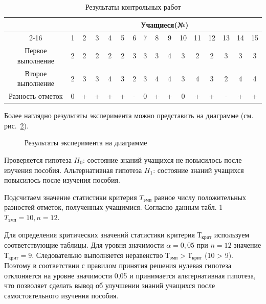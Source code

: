 \documentclass[12pt]{article}
\begin{document}
\begin{table}[h]
    \label{tbl:control-results}
    \centering
    \caption{Результаты контрольных работ}
    \bigskip
    \begin{tabular}{|c|c|c|c|c|c|c|c|c|c|c|c|c|c|c|c|} \hline
         \multirow{2}{*}{}&\multicolumn{15}{c|}{\textbf{Учащиеся(№)}} \\ \cline{2-16}
        &1&2&3&4&5&6&7&8&9&10&11&12&13&14&15 \\ \hline
        Первое выполнение&2&2&2&2&2&3&3&3&4&3&2&2&3&3&3 \\ \hline
        Второе выполнение&2&3&3&4&3&2&3&4&4&3&4&3&2&4&4 \\ \hline
        Разность отметок&0&+&+&+&+&-&0&+&+&0&+&+&-&+&+ \\ \hline
    \end{tabular}
\end{table}

Более наглядно результаты эксперимента можно представить на диаграмме (см. рис.~\hyperref[fgr:control-results]{2}).

\begin{figure}[htbp]
    \label{fgr:control-results}
    \centering
    \caption{Результаты эксперимента на диаграмме}
\end{figure}
 
Проверяется гипотеза $H_0$: состояние знаний учащихся не повысилось после изучения пособия. Альтернативная гипотеза $H_1$: состояние знаний учащихся повысилось после изучения пособия.

Подсчитаем значение статистики критерия $T_{эмп}$ равное числу положительных разностей отметок, полученных учащимися. Согласно данным табл. 1 $T_{эмп}=10, n=12$.

Для определения критических значений статистики критерия $Т_{крит}$ используем соответствующие таблицы. Для уровня значимости $\alpha = 0,05$ при $n = 12$ значение $Т_{крит} = 9$. Следовательно выполняется неравенство $Т_{эмп} > Т_{крит}$ (10 > 9). Поэтому в соответствии с правилом принятия решения нулевая гипотеза отклоняется на уровне значимости 0,05 и принимается альтернативная гипотеза, что позволяет сделать вывод об улучшении знаний учащихся после самостоятельного изучения пособия.
\end{document}
